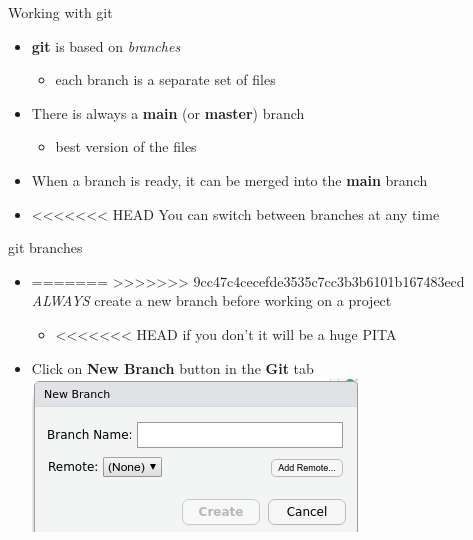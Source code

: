 \documentclass[
  ignorenonframetext,
  aspectratio=169]{beamer}
\providecommand{\tightlist}{%
  \setlength{\itemsep}{0pt}\setlength{\parskip}{0pt}}
\begin{document}
\begin{frame}{Working with git}
\protect\hypertarget{working-with-git}{}
\begin{itemize}
\tightlist
\item
  \textbf{git} is based on \emph{branches}

  \begin{itemize}
  \tightlist
  \item
    each branch is a separate set of files
  \end{itemize}
\item
  There is always a \textbf{main} (or \textbf{master}) branch

  \begin{itemize}
  \tightlist
  \item
    best version of the files
  \end{itemize}
\item
  When a branch is ready, it can be merged into the \textbf{main} branch
\item
<<<<<<< HEAD
  You can switch between branches at any time
\end{itemize}
\end{frame}

\begin{frame}{git branches}
\protect\hypertarget{git-branches}{}
\begin{itemize}
\tightlist
\item
=======
>>>>>>> 9cc47c4cecefde3535c7cc3b3b6101b167483ecd
  \emph{ALWAYS} create a new branch before working on a project

  \begin{itemize}
  \tightlist
  \item
<<<<<<< HEAD
    if you don't it will be a huge PITA
  \end{itemize}
\item
  Click on \textbf{New Branch} button in the \textbf{Git} tab
  \includegraphics{figures/new_branch.png}
\end{itemize}
\end{frame}
\end{document}
